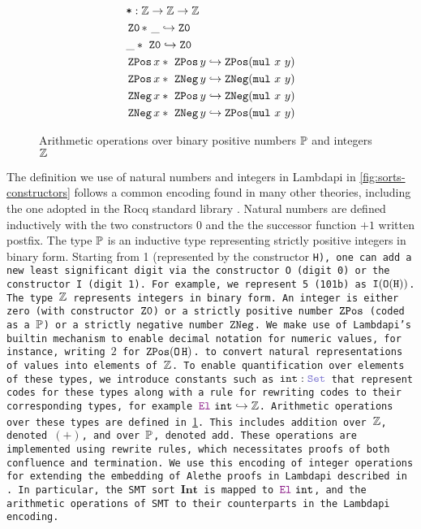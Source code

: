 \begin{figure}
\begin{framed}
{%
\begin{align*}
&\tt{*} : \bb{Z} \ra \bb{Z} \ra \bb{Z} \\
& \ZO *~\_ \re \ZO \\
& \_ *~\ZO \re \ZO \\
& \ZPos x *~\ZPos y \re \ZPos (\tt{mul}~x~y) \\
& \ZPos x *~\ZNeg    y \re \ZNeg    (\tt{mul}~x~y) \\
& \ZNeg    x *~\ZPos y \re \ZNeg    (\tt{mul}~x~y) \\
& \ZNeg    x *~\ZNeg    y \re \ZPos (\tt{mul}~x~y) \\
\end{align*}
}%
\caption{Arithmetic operations over binary positive numbers $\bb{P}$ and integers $\Z$}
\label{fig:arith-ops}
\end{framed}
\end{figure}

The definition we use of natural numbers and integers in Lambdapi in \cref{fig:sorts-constructors} follows a common encoding found in many other theories, including the one adopted in the Rocq standard library \cite{Rocq-refman}.
Natural numbers are defined inductively with the two constructors $0$ and the the successor function $+1$ written postfix.
The type $\bb{P}$  is an inductive type representing strictly positive integers in binary form.
Starting from 1 (represented by the constructor \tt{H}), one can add a new least significant digit via the constructor \tt{O} (digit 0) or the constructor \tt{I} (digit 1).
For example, we represent 5 (101b) as $\tt{I} (\tt{O} (\tt{H}))$. The type $\Z$ represents integers in binary form.
An integer is either zero (with constructor $\ZO$) or a strictly positive number $\ZPos$ (coded as a $\bb{P}$) or a strictly negative number $\ZNeg$.
We make use of Lambdapi's \lstinline[language=Lambdapi,basicstyle=\ttfamily\normalsize]|builtin| mechanism to enable decimal notation for numeric values, for instance, writing $2$ for $\ZPos (\mathop{\tt{O}} \tt{H})$.
to convert natural representations of values into elements of $\Z$.
To enable quantification over elements of these types, we introduce constants such as $\tt{int}:\set$ that represent codes for these types along with a rule for rewriting codes to their corresponding types, for example $\el~\tt{int} \re \Z$.
Arithmetic operations over these types are defined in \cref{fig:arith-ops}. This includes addition over $\Z$, denoted $(+)$, and over $\bb{P}$, denoted \texttt{add}.
These operations are implemented using rewrite rules, which necessitates proofs of both confluence and termination.
We use this encoding of integer operations for extending the embedding of Alethe proofs in Lambdapi described in \cite{ColtellacciMD24}.
In particular, the SMT sort $\textbf{Int}$ is mapped to $\el~\texttt{int}$, and the arithmetic operations of SMT to their counterparts in the Lambdapi encoding.


